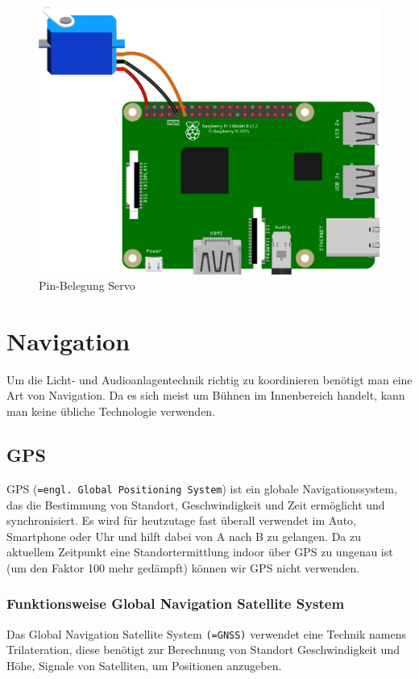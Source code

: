 \begin{figure}[H]
	\centering
	\includegraphics[width=0.7\linewidth]{images/Pin_Belegung.png}
	\caption[Pin-Belegung Servo]{Pin-Belegung Servo}
	\label{fig:PIN_Belegung}
\end{figure}
\newpage
\section{Navigation}

Um die Licht- und Audioanlagentechnik richtig zu koordinieren benötigt man eine Art von Navigation. Da es sich meist um Bühnen im Innenbereich handelt, kann man keine übliche Technologie verwenden.

\subsection{GPS}
GPS (\texttt{=engl. Global Positioning System}) ist ein globale Navigationssystem, das die Bestimmung von Standort, Geschwindigkeit und Zeit ermöglicht und synchronisiert. Es wird für heutzutage fast überall verwendet im Auto, Smartphone oder Uhr und hilft dabei von A nach B zu gelangen. \parencite{GPS} Da zu aktuellem Zeitpunkt eine Standortermittlung indoor über GPS zu ungenau ist (um den Faktor 100 mehr gedämpft) können wir GPS nicht verwenden. \textcite{Indoor}

\subsubsection{Funktionsweise Global Navigation Satellite System}

Das Global Navigation Satellite System \texttt{(=GNSS)} verwendet eine Technik namens Trilateration, diese benötigt zur Berechnung von Standort Geschwindigkeit und Höhe, Signale von Satelliten, um Positionen anzugeben. 

